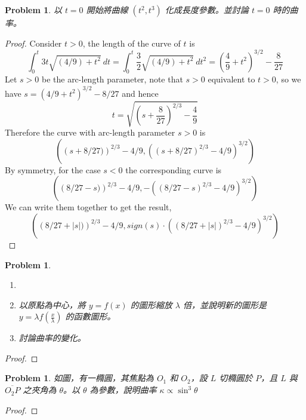 \documentclass[10pt,a4paper]{article}
\newcounter{theProblemCounter}
\newtheorem{problem}[theProblemCounter]{Problem}
\begin{document}
\setcounter{theProblemCounter}{4}
\begin{problem}
以 $t=0$ 開始將曲線 $(t^2, t^3)$ 化成長度參數。並討論 $t=0$ 時的曲率。
\end{problem}

\begin{proof}
Consider $t>0$, the length of the curve of $t$ is
\begin{equation}
\int_0^t 3t\sqrt{(4/9)+t^2}\ dt = \int_0^t \frac32\sqrt{(4/9)+t^2}\ dt^2 = \left(\frac49+t^2\right)^{3/2}-\frac{8}{27}
\end{equation}
Let $s>0$ be the arc-length parameter, note that $s>0$ equivalent to $t>0$, so we have $s=(4/9+t^2)^{3/2}-8/27$ and hence
\begin{equation}
t = \sqrt{\left(s+\frac{8}{27}\right)^{2/3} - \frac{4}{9}}
\end{equation}
Therefore the curve with arc-length parameter $s>0$ is
\begin{equation}
\left(\left(s+8/27)\right)^{2/3} - 4/9, 
\left(\left(s+8/27\right)^{2/3} - 4/9\right)^{3/2}\right)
\end{equation}
By symmetry, for the case $s<0$ the corresponding curve is
\begin{equation}
\left(\left(8/27-s)\right)^{2/3} - 4/9, 
-\left(\left(8/27-s\right)^{2/3} - 4/9\right)^{3/2}\right)
\end{equation}
We can write them together to get the result,
\begin{equation}
\left(\left(8/27+|s|)\right)^{2/3} - 4/9, 
sign(s)\cdot\left(\left(8/27+|s|\right)^{2/3} - 4/9\right)^{3/2}\right)
\end{equation}
\end{proof}

\setcounter{theProblemCounter}{5}
\begin{problem}
\begin{enumerate}
\item[]
\item[(a)] 以原點為中心，將 $y=f(x)$ 的圖形縮放 $\lambda$ 倍，並說明新的圖形是 $y=\lambda f(\frac{x}{\lambda})$ 的函數圖形。
\item[(b)] 討論曲率的變化。
\end{enumerate}
\end{problem}
\begin{proof}
\end{proof}

\setcounter{theProblemCounter}{6}
\begin{problem}
如圖，有一橢圓，其焦點為 $O_1$ 和 $O_2$，設 $L$ 切橢圓於 $P$，且 $L$ 與 $\overline{O_2P}$ 之夾角為 $\theta$。以 $\theta$ 為參數，說明曲率 $\kappa\propto\sin^3\theta$
\end{problem}
\begin{proof}
\end{proof}
\end{document}
